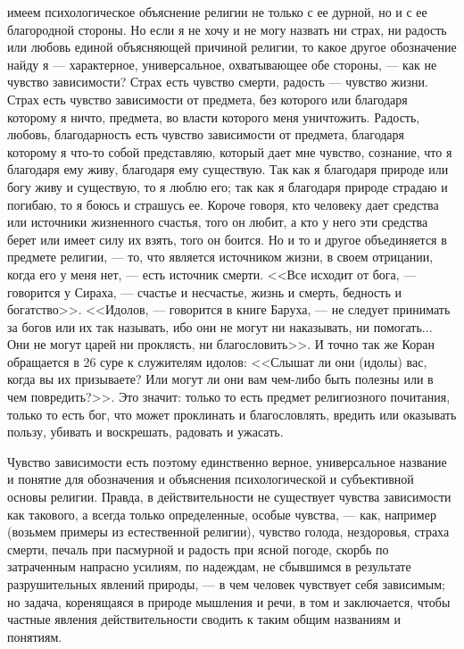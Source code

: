 \documentclass[12pt]{article}
\begin{document}
имеем психологическое объяснение религии не только с ее дурной, но и с ее благородной стороны. Но если я не хочу и не могу назвать ни страх, ни радость или любовь единой объясняющей причиной религии, то какое другое обозначение найду я --- характерное, универсальное, охватывающее обе стороны, --- как не чувство зависимости? Страх есть чувство смерти, радость --- чувство жизни. Страх есть чувство зависимости от предмета, без которого или благодаря которому я ничто, предмета, во власти которого меня уничтожить. Радость, любовь, благодарность есть чувство зависимости от предмета, благодаря которому я что-то собой представляю, который дает мне чувство, сознание, что я благодаря ему живу, благодаря ему существую. Так как я благодаря природе или богу живу и существую, то я люблю его; так как я благодаря природе страдаю и погибаю, то я боюсь и страшусь ее. Короче говоря, кто человеку дает средства или источники жизненного счастья, того он любит, а кто у него эти средства берет или имеет силу их взять, того он боится. Но и то и другое объединяется в предмете религии, --- то, что является источником жизни, в своем отрицании, когда его у меня нет, --- есть источник смерти. <<Все исходит от бога, --- говорится у Сираха, --- счастье и несчастье, жизнь и смерть, бедность и богатство>>. <<Идолов, --- говорится в книге Баруха, --- не следует принимать за богов или их так называть, ибо они не могут ни наказывать, ни помогать... Они не могут царей ни проклясть, ни благословить>>. И точно так же Коран обращается в 26 суре к служителям идолов: <<Слышат ли они (идолы) вас, когда вы их призываете? Или могут ли они вам чем-либо быть полезны или в чем повредить?>>. Это значит: только то есть предмет религиозного почитания, только то есть бог, что может проклинать и благословлять, вредить или оказывать пользу, убивать и воскрешать, радовать и ужасать. 

Чувство зависимости есть поэтому единственно верное, универсальное название и понятие для обозначения и объяснения психологической и субъективной основы религии. Правда, в действительности не существует чувства зависимости как такового, а всегда только определенные, особые чувства, --- как, например (возьмем примеры из естественной религии), чувство голода, нездоровья, страха смерти, печаль при пасмурной и радость при ясной погоде, скорбь по затраченным напрасно усилиям, по надеждам, не сбывшимся в результате разрушительных явлений природы, --- в чем человек чувствует себя зависимым; но задача, коренящаяся в природе мышления и речи, в том и заключается, чтобы частные явления действительности сводить к таким общим названиям и понятиям. 
\end{document}
